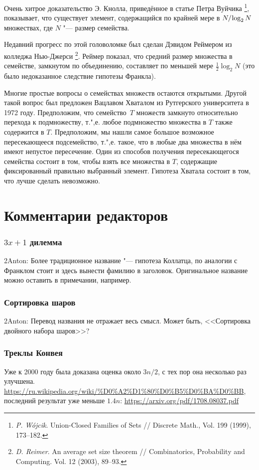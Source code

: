 \documentclass[twoside]{book}
\begin{document}
Очень хитрое доказательство Э. Кнолла, приведённое в статье Петра Вуйчика%
\footnote{\emph{P. W\'{o}jcik}. Union-Closed Families of Sets /\!/ {Discrete Math.}, Vol. 199 (1999), 173--182.},
показывает, что существует элемент, содержащийся по крайней мере в $N/\mkern-2mu\log_2 N$ множествах, где $N$ "--- размер семейства.

Недавний прогресс по этой головоломке был сделан Дэвидом Реймером из колледжа Нью-Джерси%
\footnote{\emph{D. Reimer}. An average set size theorem /\!/ {Combinatorics, Probability and Computing.} Vol. 12 (2003), 89--93.}.
Реймер показал, что средний размер множества в семействе, замкнутом по объединению, составляет по меньшей мере $\tfrac12\log_2N$ (это было недоказанное следствие гипотезы Франкла).

Многие простые вопросы о семействах множеств остаются открытыми.
Другой такой вопрос был предложен Вацлавом Хваталом из Рутгерского университета в 1972 году.
Предположим, что семейство~$T$ множеств замкнуто относительно перехода к подмножеству, т.",е. любое подмножество множества в $T$ также содержится в $T$.
Предположим,  мы нашли самое большое возможное пересекающееся подсемейство, т.",е. такое, что в любые два множества в нём имеют непустое пересечение.
Один из способов получения пересекающегося семейства состоит в том, чтобы взять все множества в $T$, содержащие фиксированный правильно выбранный элемент.
Гипотеза Хватала состоит в том, что лучше сделать невозможно.

\section*{Комментарии редакторов}

\subsubsection*{$3x+1$ дилемма}
2Anton: Более традиционное название "--- гипотеза Коллатца, по аналогии с Франклом стоит и здесь вынести фамилию в заголовок.
Оригинальное название можно оставить в примечании, например.

\subsubsection{Сортировка шаров}
2Anton: Перевод названия не отражает весь смысл.  
Может быть, <<Сортировка двойного набора шаров>>?

\subsubsection{Треклы Конвея}
Уже к 2000 году была доказана оценка около $3n/2$, с тех пор она несколько раз улучшена. 
\url{https://ru.wikipedia.org/wiki/%D0%A2%D1%80%D0%B5%D0%BA%D0%BB}, последний результат уже меньше $1.4n$: 
\url{https://arxiv.org/pdf/1708.08037.pdf}
\end{document}
